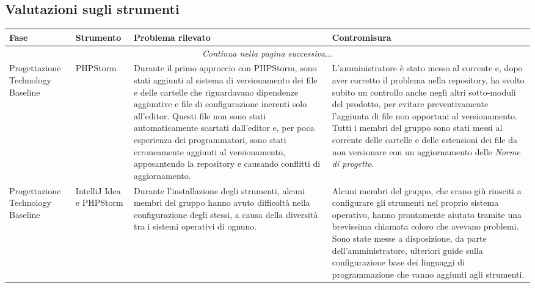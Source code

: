 	\subsection{Valutazioni sugli strumenti}

		\begin{center}
			\begin{longtable}{|p{2.5cm}|p{2.5cm}|p{5cm}|p{5cm}|}
				\hline
				\rowcolor{lighter-grayer}
				\textbf{Fase} & \textbf{Strumento} & \textbf{Problema rilevato} & \textbf{Contromisura}\\
				\hline
				\endfirsthead
				\hline
			    \multicolumn{4}{|c|}{\textit{Continua nella pagina successiva...}}\\
			    \hline
			    \endfoot
			    \endlastfoot

			    \hline
			    Progettazione Technology Baseline
			    &
				PHPStorm
				&
				Durante il primo approccio con PHPStorm, sono stati aggiunti al sistema di versionamento dei file e delle cartelle che riguardavano dipendenze aggiuntive e file di configurazione inerenti solo all'editor. Questi file non sono stati automaticamente scartati dall'editor e, per poca esperienza dei programmatori, sono stati erroneamente aggiunti al versionamento, appesantendo la repository e causando conflitti di aggiornamento.
				&
				L'amministratore è stato messo al corrente e, dopo aver corretto il problema nella repository, ha svolto subito un controllo anche negli altri sotto-moduli del prodotto, per evitare preventivamente l'aggiunta di file non opportuni al versionamento. Tutti i membri del gruppo sono stati messi al corrente delle cartelle e delle estensioni dei file da non versionare con un aggiornamento delle \textit{Norme di progetto}.\\

			    \hline
			    Progettazione Technology Baseline
			    &
				IntelliJ Idea e PHPStorm
				&
				Durante l'installazione degli strumenti, alcuni membri del gruppo hanno avuto difficoltà nella configurazione degli stessi, a causa della diversità tra i sistemi operativi di ognuno.
				&
				Alcuni membri del gruppo, che erano giù riusciti a configurare gli strumenti nel proprio sistema operativo, hanno prontamente aiutato tramite una brevissima chiamata \glock{Discord} coloro che avevano problemi. Sono state messe a disposizione, da parte dell'amministratore, ulteriori guide sulla configurazione base dei linguaggi di programmazione che vanno aggiunti agli strumenti. \\


\end{longtable}
\end{center}
